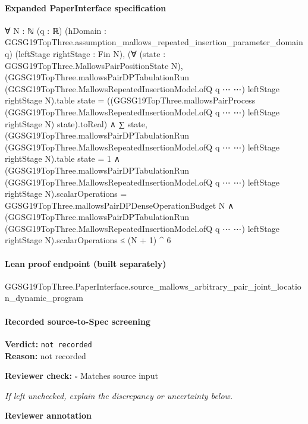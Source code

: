 \documentclass[10pt]{article}
\newcommand{\reviewerbox}{%
  \par\noindent\fbox{\parbox{0.96\linewidth}{\rule{0pt}{0.38in}}}\par
}
\newcommand{\reviewmatch}[1]{%
  \par\noindent\textbf{Reviewer check:} $\square$\; #1\par
  \noindent\emph{If left unchecked, explain the discrepancy or uncertainty below.}\par
}
\begin{document}
\paragraph{Expanded PaperInterface specification}
\begin{ReviewVerbatim}
∀ {N : ℕ} (q : ℝ) (hDomain : GGSG19TopThree.assumption_mallows_repeated_insertion_parameter_domain q)
  (leftStage rightStage : Fin N),
  (∀ (state : GGSG19TopThree.MallowsPairPositionState N),
      (GGSG19TopThree.mallowsPairDPTabulationRun (GGSG19TopThree.MallowsRepeatedInsertionModel.ofQ q ⋯ ⋯) leftStage
              rightStage N).table
          state =
        ((GGSG19TopThree.mallowsPairProcess (GGSG19TopThree.MallowsRepeatedInsertionModel.ofQ q ⋯ ⋯) leftStage
              rightStage N)
            state).toReal) ∧
    ∑ state,
          (GGSG19TopThree.mallowsPairDPTabulationRun (GGSG19TopThree.MallowsRepeatedInsertionModel.ofQ q ⋯ ⋯) leftStage
                rightStage N).table
            state =
        1 ∧
      (GGSG19TopThree.mallowsPairDPTabulationRun (GGSG19TopThree.MallowsRepeatedInsertionModel.ofQ q ⋯ ⋯) leftStage
              rightStage N).scalarOperations =
          GGSG19TopThree.mallowsPairDPDenseOperationBudget N ∧
        (GGSG19TopThree.mallowsPairDPTabulationRun (GGSG19TopThree.MallowsRepeatedInsertionModel.ofQ q ⋯ ⋯) leftStage
              rightStage N).scalarOperations ≤
          (N + 1) ^ 6
\end{ReviewVerbatim}

\paragraph{Lean proof endpoint (built separately)}\begin{ReviewVerbatim}
GGSG19TopThree.PaperInterface.source_mallows_arbitrary_pair_joint_location_dynamic_program
\end{ReviewVerbatim}

\paragraph{Recorded source-to-Spec screening}
\textbf{Verdict:} \texttt{not recorded}
\\
\textbf{Reason:} not recorded
\reviewmatch{Matches source input}
\noindent\textbf{Reviewer annotation}\par
\reviewerbox
\end{document}

